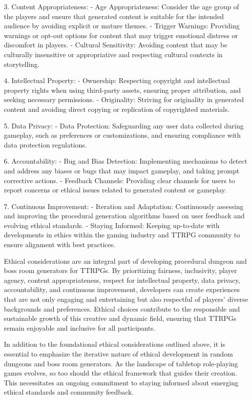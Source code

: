 \documentclass[10pt,twocolumn]{article}
\begin{document}
3. Content Appropriateness:
   - Age Appropriateness: Consider the age group of the players and ensure that generated content is suitable for the intended audience by avoiding explicit or mature themes.
   - Trigger Warnings: Providing warnings or opt-out options for content that may trigger emotional distress or discomfort in players.
   - Cultural Sensitivity: Avoiding content that may be culturally insensitive or appropriative and respecting cultural contexts in storytelling\cite{bourke2017morality_ethics_rpg}.

4. Intellectual Property:
   - Ownership: Respecting copyright and intellectual property rights when using third-party assets, ensuring proper attribution, and seeking necessary permissions.
   - Originality: Striving for originality in generated content and avoiding direct copying or replication of copyrighted materials.

5. Data Privacy:
   - Data Protection: Safeguarding any user data collected during gameplay, such as preferences or customizations, and ensuring compliance with data protection regulations.

6. Accountability:
   - Bug and Bias Detection: Implementing mechanisms to detect and address any biases or bugs that may impact gameplay, and taking prompt corrective actions.
   - Feedback Channels: Providing clear channels for users to report concerns or ethical issues related to generated content or gameplay.\cite{quinn2022ethics_rpg}

7. Continuous Improvement:
   - Iteration and Adaptation: Continuously assessing and improving the procedural generation algorithms based on user feedback and evolving ethical standards.
   - Staying Informed: Keeping up-to-date with developments in ethics within the gaming industry and TTRPG community to ensure alignment with best practices.

Ethical considerations are an integral part of developing procedural dungeon and boss room generators for TTRPGs. By prioritizing fairness, inclusivity, player agency, content appropriateness, respect for intellectual property, data privacy, accountability, and continuous improvement, developers can create experiences that are not only engaging and entertaining but also respectful of players' diverse backgrounds and preferences. Ethical choices contribute to the responsible and sustainable growth of this creative and dynamic field, ensuring that TTRPGs remain enjoyable and inclusive for all participants.

In addition to the foundational ethical considerations outlined above, it is essential to emphasize the iterative nature of ethical development in random dungeons and boss room generators. As the landscape of tabletop role-playing games evolves, so too should the ethical framework that guides their creation. This necessitates an ongoing commitment to staying informed about emerging ethical standards and community feedback.
\end{document}

